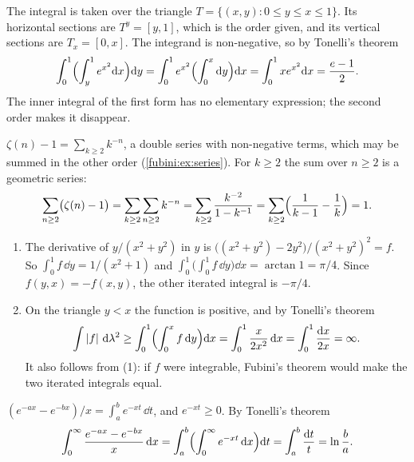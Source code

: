 \section{}

The integral is taken over the triangle
$T = \{(x, y) : 0\leq y\leq x\leq1\}$. Its horizontal sections are
$T^y = [y, 1]$, which is the order given, and its vertical sections are
$T_x = [0, x]$. The integrand is non-negative, so by Tonelli's theorem
\[
  \int_0^1\Bigl(\int_y^1e^{x^2}\mathrm{d} x\Bigr)\mathrm{d} y
  = \int_0^1e^{x^2}\Bigl(\int_0^x\mathrm{d} y\Bigr)\mathrm{d} x
  = \int_0^1xe^{x^2}\mathrm{d} x = \frac{e - 1}2 .
\]
The inner integral of the first form has no elementary expression; the
second order makes it disappear.

$\zeta(n) - 1 = \sum_{k\geq2}k^{-n}$, a double series with non-negative
terms, which may be summed in the other order
(\cref{fubini:ex:series}). For $k\geq2$ the sum over $n\geq2$ is a
geometric series:
\[
  \sum_{n\geq2}\bigl(\zeta(n) - 1\bigr)
  = \sum_{k\geq2}\sum_{n\geq2}k^{-n}
  = \sum_{k\geq2}\frac{k^{-2}}{1 - k^{-1}}
  = \sum_{k\geq2}\Bigl(\frac1{k - 1} - \frac1k\Bigr) = 1 .
\]

\begin{enumerate}[nosep]
  \item The derivative of $y/(x^2 + y^2)$ in $y$ is
        $\bigl((x^2 + y^2) - 2y^2\bigr)/(x^2 + y^2)^2 = f$. So
        $\int_0^1f\,\dd y = 1/(x^2 + 1)$ and
        $\int_0^1\bigl(\int_0^1f\,\dd y\bigr)\dd x = \arctan1 = \pi/4$.
        Since $f(y, x) = -f(x, y)$, the other iterated integral is
        $-\pi/4$.
  \item On the triangle $y < x$ the function is positive, and by
        Tonelli's theorem
        \[
          \int\left|f\right|\,\mathrm{d}\lambda^2
          \geq\int_0^1\Bigl(\int_0^xf\,\mathrm{d} y\Bigr)\mathrm{d} x
          = \int_0^1\frac x{2x^2}\,\mathrm{d} x
          = \int_0^1\frac{\mathrm{d} x}{2x} = \infty .
        \]
        It also follows from (1): if $f$ were integrable, Fubini's
        theorem would make the two iterated integrals equal.
\end{enumerate}

$(e^{-ax} - e^{-bx})/x = \int_a^be^{-xt}\,\dd t$, and $e^{-xt}\geq0$. By
Tonelli's theorem
\[
  \int_0^\infty\frac{e^{-ax} - e^{-bx}}x\,\mathrm{d} x
  = \int_a^b\Bigl(\int_0^\infty e^{-xt}\,\mathrm{d} x\Bigr)\mathrm{d} t
  = \int_a^b\frac{\mathrm{d} t}t = \ln\frac ba .
\]

